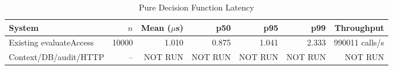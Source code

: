 \begin{table}[t]
\caption{Pure Decision Function Latency}
\label{tab:mcac-latency}
\centering
\begin{tabular}{lrrrrrr}
\hline
System & $n$ & Mean ($\mu$s) & p50 & p95 & p99 & Throughput \\
\hline
Existing evaluateAccess & 10000 & 1.010 & 0.875 & 1.041 & 2.333 & 990011 calls/s \\
Context/DB/audit/HTTP & -- & NOT RUN & NOT RUN & NOT RUN & NOT RUN & NOT RUN \\
\hline
\end{tabular}
\end{table}
